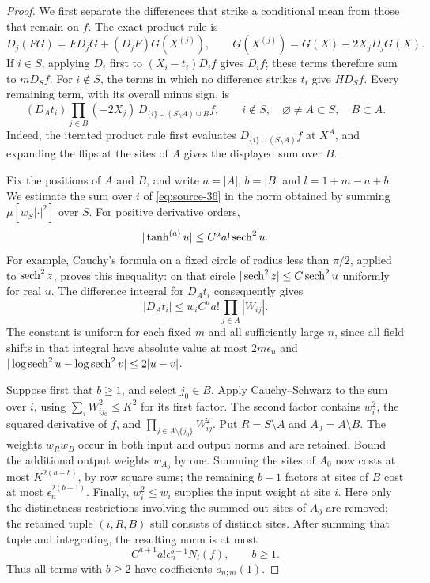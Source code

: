 \begin{proof}
We first separate the differences that strike a conditional mean from those
that remain on $f$.  The exact product rule is
\[
 D_j(FG)=F D_jG+(D_jF)G(X^{(j)}),
 \qquad G(X^{(j)})=G(X)-2X_jD_jG(X).
\]
If $i\in S$, applying $D_i$ first to $(X_i-t_i)D_if$ gives $D_if$;
these terms therefore sum to $mD_Sf$.  For $i\notin S$, the terms in which
no difference strikes $t_i$ give $HD_Sf$.  Every remaining term, with its
overall minus sign, is
\begin{equation}
 (D_A t_i)\prod_{j\in B}(-2X_j)\,
 D_{\{i\}\cup(S\setminus A)\cup B}f,
 \qquad i\notin S,\quad \varnothing\ne A\subset S,\quad B\subset A.
 \label{eq:source-36}
\end{equation}
Indeed, the iterated product rule first evaluates
$D_{\{i\}\cup(S\setminus A)}f$ at $X^A$, and expanding the flips at the
sites of $A$ gives the displayed sum over $B$.

Fix the positions of $A$ and $B$, and write $a=|A|$, $b=|B|$ and
$l=1+m-a+b$.  We estimate the sum over $i$ of
\eqref{eq:source-36} in the norm obtained by summing
$\mu[w_S|\cdot|^2]$ over $S$.  For positive derivative orders,
\[
 |\tanh^{(a)}u|\le C^a a!\operatorname{sech}^2u.
\]
For example, Cauchy's formula on a fixed circle of radius less than
$\pi/2$, applied to $\operatorname{sech}^2z$, proves this inequality: on that circle
$|\operatorname{sech}^2z|\le C\operatorname{sech}^2u$ uniformly for real $u$.
The difference integral for $D_A t_i$ consequently gives
\begin{equation}
 |D_A t_i|\le w_i C^a a!\prod_{j\in A}|W_{ij}|.
 \label{eq:micro-coefficient-bound}
\end{equation}
The constant is uniform for each fixed $m$ and all sufficiently large $n$,
since all field shifts in that integral have absolute value at most
$2m\epsilon_n$ and $|\log\operatorname{sech}^2u-\log\operatorname{sech}^2v|\le2|u-v|$.

Suppose first that $b\ge1$, and select $j_0\in B$.  Apply Cauchy--Schwarz
to the sum over $i$, using $\sum_iW_{ij_0}^2\le K^2$ for its first factor.
The second factor contains $w_i^2$, the squared derivative of $f$, and
$\prod_{j\in A\setminus\{j_0\}}W_{ij}^2$.  Put $R=S\setminus A$ and
$A_0=A\setminus B$.  The weights $w_Rw_B$ occur in both input and output
norms and are retained.  Bound the additional output weights $w_{A_0}$
by one.  Summing the sites of $A_0$ now costs at most $K^{2(a-b)}$, by
row square sums; the remaining $b-1$ factors at sites of $B$ cost at most
$\epsilon_n^{2(b-1)}$.  Finally, $w_i^2\le w_i$ supplies the input weight
at site $i$.  Here only the distinctness restrictions involving the
summed-out sites of $A_0$ are removed; the retained tuple $(i,R,B)$
still consists of distinct sites.  After summing that tuple and integrating,
the resulting norm is at most
\begin{equation}
 C^{a+1}a!\epsilon_n^{b-1}N_l(f),\qquad b\ge1.
 \label{eq:micro-shared-slot-bound}
\end{equation}
Thus all terms with $b\ge2$ have coefficients $o_{n;m}(1)$.


\end{proof}
